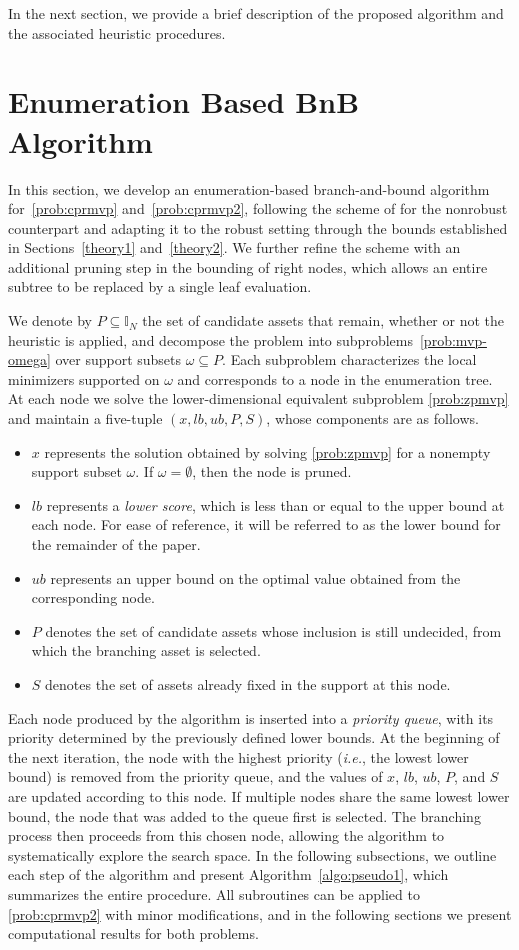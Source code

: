 \documentclass[11pt]{article}
\theoremstyle{plain}
\theoremstyle{definition}
\theoremstyle{plain}
\newcommand{\II}{{\mathbb I}}
\begin{document}
In the next section, we provide a brief description of the proposed algorithm and the associated heuristic procedures.
\section{Enumeration Based BnB Algorithm}\label{BBalgo}
In this section, we develop an enumeration-based branch-and-bound algorithm for~\eqref{prob:cprmvp} and~\eqref{prob:cprmvp2}, following the scheme of \cite{SenAkkayaPinar2025} for the nonrobust counterpart and adapting it to the robust setting through the bounds established in Sections~\ref{theory1} and~\ref{theory2}. We further refine the scheme with an additional pruning step in the bounding of right nodes, which allows an entire subtree to be replaced by a single leaf evaluation.

We denote by $P \subseteq\II_N$ the set of candidate assets that remain, whether or not the heuristic is applied, and decompose the problem into subproblems~\eqref{prob:mvp-omega} over support subsets $\omega \subseteq P$. Each subproblem characterizes the local minimizers supported on $\omega$ and corresponds to a node in the enumeration tree. At each node we solve the lower-dimensional equivalent subproblem \eqref{prob:zpmvp} and maintain a five-tuple $(x, lb, ub, P, S)$, whose components are as follows.
\begin{itemize}
    \item $x$ represents the solution obtained by solving \eqref{prob:zpmvp} for a nonempty support subset $\omega$. If $\omega=\emptyset$, then the node is pruned.
    \item $lb$ represents a \emph{lower score}, which is less than or equal to the upper bound at each node. For ease of reference, it will be referred to as the lower bound for the remainder of the paper.
    \item $ub$ represents an upper bound on the optimal value obtained from the corresponding node.
   \item $P$ denotes the set of candidate assets whose inclusion is still undecided, from which the branching asset is selected. 
    \item $S$ denotes the set of assets already fixed in the support at this node.
\end{itemize}
 Each node produced by the algorithm is inserted into a \emph{priority queue}, with its priority determined by the previously defined lower bounds. At the beginning of the next iteration, the node with the highest priority
(\textit{i.e.}, the lowest lower bound) is removed from the priority queue, and the
values of $x$, $lb$, $ub$, $P$, and $S$ are updated according to this node.
If multiple nodes share the same lowest lower bound, the node that was added
to the queue first is selected. The branching process then proceeds from this
chosen node, allowing the algorithm to systematically explore the search space. In the following subsections, we outline each step of the algorithm and present Algorithm~\ref{algo:pseudo1}, which summarizes the entire procedure.
All subroutines can be applied to \eqref{prob:cprmvp2} with minor modifications,
and in the following sections we present computational results for both problems.
\end{document}
